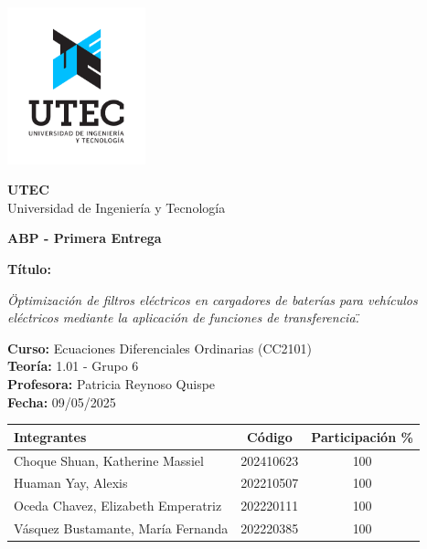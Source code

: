 \begin{titlepage}
    \centering
    
    \includegraphics[width=0.3\textwidth]{utec.png}
    
    \vspace{0.3cm}
    \textbf{UTEC}\\
    Universidad de Ingenier\'ia y Tecnolog\'ia
    
    \vspace{1.5cm}
    
    {\Large\textbf{ABP - Primera Entrega}\par}
    
    \vspace{1cm}
    
    {\bfseries T\'itulo:}\\
    \begin{minipage}{0.9\textwidth}
    \centering
    \textit{\"Optimizaci\'on de filtros el\'ectricos en cargadores de bater\'ias para veh\'iculos el\'ectricos mediante la aplicaci\'on de funciones de transferencia.\"}
    \end{minipage}
    
    \vspace{1cm}
    
    {\bfseries Curso:} Ecuaciones Diferenciales Ordinarias (CC2101)\\
    {\bfseries Teor\'ia:} 1.01 - Grupo 6\\
    {\bfseries Profesora:} Patricia Reynoso Quispe\\
    {\bfseries Fecha:} 09/05/2025

    
    \vspace{1.5cm}
    
    \renewcommand{\arraystretch}{1.3}
    \begin{center}
    \begin{tabular}{|>{\raggedright\arraybackslash}p{6cm}|c|c|}
    \hline
    \textbf{Integrantes} & \textbf{C\'odigo} & \textbf{Participaci\'on \%} \\
    \hline
    Choque Shuan, Katherine Massiel & 202410623 & 100 \\
    Huaman Yay, Alexis & 202210507 & 100 \\
    Oceda Chavez, Elizabeth Emperatriz & 202220111 & 100 \\
    V\'asquez Bustamante, Mar\'ia Fernanda & 202220385 & 100 \\
    \hline
    \end{tabular}
    \end{center}
    
    \end{titlepage}